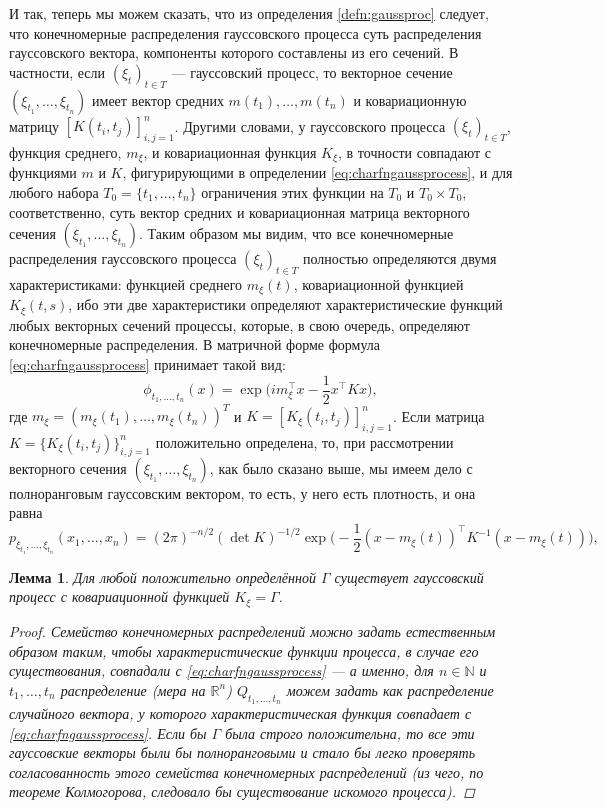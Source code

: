 \documentclass[10pt]{article}
\newtheorem{lemma}[thm]{Лемма}
\theoremstyle{boldnormal}
\newcommand{\N}{{\ensuremath{\mathbb{N}}}}
\newcommand{\R}{{\ensuremath{\mathbb{R}}}}
\theoremstyle{boldremark}
\newenvironment{remark}
  {\pushQED{\qed}\renewcommand{\qedsymbol}{$\diamond$}\rem}
  {\popQED\endrem}
\begin{document}
И так, теперь мы можем сказать, что из 
определения \ref{defn:gaussproc} следует,
что конечномерные распределения гауссовского процесса
суть распределения гауссовского вектора,
компоненты которого составлены из его сечений. 
В частности, если \((\xi_t)_{t\in T}\) --- гауссовский 
процесс, то векторное сечение \((\xi_{t_1},\ldots,\xi_{t_n})\) 
имеет вектор средних \(m(t_1),\ldots,m(t_n)\) и 
ковариационную матрицу \([K(t_i,t_j)]_{i,j=1}^n\). 
Другими словами, у гауссовского процесса \((\xi_t)_{t\in T}\),
функция среднего, \(m_{\xi}\), и ковариационная функция
\(K_{\xi}\), в точности совпадают с функциями 
\(m\) и \(K\), фигурирующими в определении \eqref{eq:charfngaussprocess},
и для любого набора \(T_0=\{t_1,\ldots,t_n\}\) ограничения 
этих функции на \(T_0\) и \(T_0\times T_0\), соответственно,
суть вектор средних и ковариационная матрица векторного
сечения \((\xi_{t_1},\ldots,\xi_{t_n})\).
\begin{remark}\label{remark:gaussprocdetbychars}
Таким образом мы видим, что все 
 конечномерные распределения гауссовского процесса \((\xi_t)_{t\in T}\)
 полностью определяются двумя характеристиками: функцией среднего $m_\xi(t)$,
ковариационной функцией $K_\xi(t,s)$, ибо эти две характеристики
определяют характеристические функций любых векторных 
сечений процессы, которые,
в свою очередь, определяют конечномерные распределения.
\end{remark}
В матричной форме формула \eqref{eq:charfngaussprocess} принимает такой вид:
$$
\phi_{t_1,\ldots,t_n}({x}) = 
\exp\big( i {m}_\xi^\intercal  {x} - \frac{1}{2} {x}^\intercal K {x} \big),
$$ 
где ${m}_\xi = (m_\xi(t_1),\dots,m_\xi(t_n))^T$ и
$K = [K_\xi(t_i, t_j)]_{i,j=1}^n$.
Если матрица $K = \{K_\xi(t_i, t_j)\}_{i,j=1}^n$ положительно определена,
то, при рассмотрении векторного сечения 
\((\xi_{t_1},\ldots,\xi_{t_n})\), как было сказано выше, мы имеем дело
с полноранговым гауссовским вектором, то есть, у него есть плотность, 
и она равна
\[
p_{\xi_{t_1},\dots,\xi_{t_n}}(x_1,\dots,x_n) =
(2\pi)^{-n/2} (\det K)^{-1/2} 
\exp\big( -\frac{1}{2} ({x} - {m_\xi(t)})^\intercal K^{-1}({x}
 - {m_\xi(t)}) \big),
\]
\begin{lemma}\label{lemma:existencegaussproc}
Для любой положительно определённой $\Gamma$ существует
гауссовский процесс с ковариационной функцией $K_\xi = \Gamma$.
\begin{proof}
Семейство конечномерных распределений можно задать
естественным образом таким, чтобы характеристические функции 
процесса, в случае его существования, совпадали 
с \eqref{eq:charfngaussprocess} --- а именно, для 
\(n\in \N\) и \(t_1,\ldots,t_n\) 
распределение (мера на \(\R^n\)) \(Q_{t_1,\ldots,t_n}\) можем 
задать 
как распределение случайного вектора, у которого 
характеристическая функция совпадает с \eqref{eq:charfngaussprocess}.
Если бы \(\Gamma\) была строго положительна, то все 
эти гауссовские векторы были бы полноранговыми и стало бы легко 
проверять согласованность этого семейства конечномерных 
распределений (из чего, по теореме Колмогорова, следовало бы 
существование искомого процесса).
\end{proof}
\end{lemma}
\end{document}
